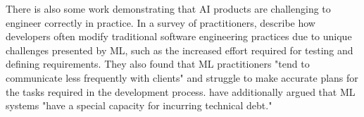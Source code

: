 \documentclass[acmconf,manuscript,screen,natbib=true]{acmart}
\begin{document}
There is also some work demonstrating that AI products are challenging to engineer correctly in practice.
In a survey of practitioners, \citet{ml_software_practices} describe how developers often modify traditional software engineering practices due to unique challenges presented by ML, such as the increased effort required for testing and defining requirements. They also found that ML practitioners "tend to communicate less frequently with clients" and struggle to make accurate plans for the tasks required in the development process.
\citet{sculley2015hidden} have additionally argued that ML systems "have a special capacity for incurring technical debt."





\end{document}
